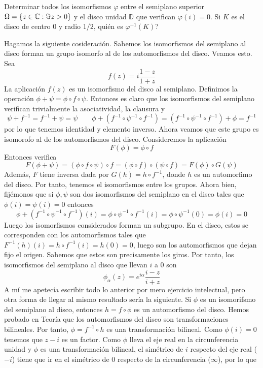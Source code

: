 \documentclass[twoside]{article}
\begin{document}
\newpage
\begin{ejercicio}{7}
Determinar todos los isomorfismos $\varphi$ entre el semiplano superior $\Omega=\{ z\in \mathbb{C} : \Im z >0 \}$ y el disco unidad $\mathbb{D}$ que verifican $\varphi(i)=0$. Si $K$ es el disco de centro $0$ y radio $1/2$, quién es $\varphi^{-1}(K)$?
\end{ejercicio}
\begin{solucion}
Hagamos la siguiente cosideración. Sabemos los isomorfismos del semiplano al disco forman un grupo isomorfo al de los automorfismos del disco. Veamos esto. Sea
$$
f(z) = i\frac{1-z}{1+z}
$$
La aplicación $f(z)$ es un isomorfismo del disco al semiplano.
Definimos la operación $\phi+\psi = \phi \circ f \circ \psi$. Entonces es claro que los isomorfismos del semiplano verifican trivialmente la asociatividad, la clausura y
$$
\psi + f^{-1} = f^{-1} + \psi = \psi \qquad \phi + (f^{-1} \circ \psi^{-1} \circ f^{-1}) = (f^{-1} \circ \psi^{-1} \circ f^{-1}) + \phi = f^{-1}
$$
por lo que tenemos identidad y elemento inverso. Ahora veamos que este grupo es isomorofo al de los automorfismos del disco.  Consideremos la aplicación
$$
F(\phi) =  \phi \circ f
$$
Entonces verifica
$$
F(\phi + \psi) =(\phi \circ f \circ \psi) \circ f= (\phi\circ f)\circ (\psi\circ f) = F(\phi)\circ G(\psi)
$$
Además, $F$ tiene inversa dada por $G(h) = h \circ f^{-1}$, donde $h$ es un automorfimo del disco. Por tanto, tenemos el isomorfismos entre los grupos. Ahora bien, fijémonos que si $\phi,\psi$ son dos isomorfismos del semiplano en el disco tales que $\phi(i)=\psi(i)=0$ entonces
$$
\phi + (f^{-1}\circ \psi^{-1} \circ f^{-1})(i) = \phi \circ \psi^{-1} \circ f^{-1} (i) = \phi\circ \psi^{-1}(0) =\phi(i)=0
$$
Luego los isomorfismos considerados forman un subgrupo. En el disco, estos se corresponden con los automorfismos tales que $F^{-1}(h)(i) = h \circ f^{-1}(i)= h(0) = 0$, luego son los automorfismos que dejan fijo el origen. Sabemos que estos son precisamente los giros. Por tanto, los isomorfismos del semiplano al disco que llevan $i$ a $0$ son
$$
\phi_\alpha(z) = e^{i\alpha}\frac{i-z}{i+z}
$$
\newpage
A mí me apetecía escribir todo lo anterior por mero ejercicio intelectual, pero otra forma de llegar al mismo resultado sería la siguiente. Si $\phi$ es un isomorifsmo del semiplano al disco, entonces $h = f \circ \phi$ es un automorfismo del disco. Hemos probado en Teoría que los automorfismos del disco son transformaciones bilineales. Por tanto, $\phi = f^{-1}\circ h$ es una transformación bilineal. Como $\phi(i)=0$ tenemos que $z-i$ es un factor. Como $\phi$ lleva el eje real en la circunferencia unidad y $\phi$ es una transformación bilineal, el simétrico de $i$ respecto del eje real ($-i$) tiene que ir en el simétrico de $0$ respecto de la circunferencia ($\infty$), por lo que 

\end{solucion}
\end{document}
